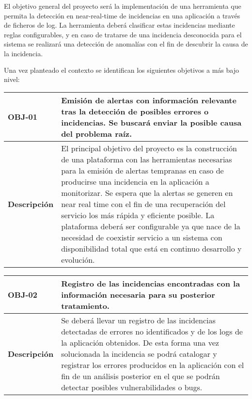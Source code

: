 El objetivo general del proyecto será la implementación de una herramienta que permita la detección en near-real-time de incidencias en una aplicación a través de ficheros de log. La herramienta deberá clasificar estas incidencias mediante reglas configurables, y en caso de tratarse de una incidencia desconocida para el sistema se realizará una detección de anomalías con el fin de descubrir la causa de la incidencia.

Una vez planteado el contexto se identifican los siguientes objetivos a más bajo nivel:


\begin{table}[H]
\centering
\renewcommand{\arraystretch}{1.5}
\begin{tabular}{| p{2.5cm} | p{10cm} |}
\hline
\bf{OBJ-01} \cellcolor{Gray} & \textbf{Emisión de alertas con información relevante tras la detección de posibles errores o
incidencias. Se buscará enviar la posible causa del problema raíz.} \\
\hline
\bf{Descripción} \cellcolor{Gray} & 
El principal objetivo del proyecto es la construcción de una plataforma con las herramientas necesarias para la emisión de alertas tempranas en caso de producirse una incidencia en la aplicación a monitorizar. Se espera que la alertas se generen en near real time con el fin de una recuperación del servicio los más rápida y eficiente posible. La plataforma deberá ser configurable ya que nace de la necesidad de coexistir servicio a un sistema con disponibilidad total que está en continuo desarrollo y evolución.
\\
\hline
\end{tabular}
\end{table}


\begin{table}[H]
\centering
\renewcommand{\arraystretch}{1.5}
\begin{tabular}{| p{2.5cm} | p{10cm} |}
\hline

\bf{OBJ-02} \cellcolor{Gray} & \textbf{Registro de las incidencias encontradas con la información necesaria para su posterior
tratamiento.} \\
\hline
\bf{Descripción} \cellcolor{Gray} & Se deberá llevar un registro de las incidencias detectadas de errores no identificados y de los logs de la aplicación obtenidos. De esta forma una vez solucionada la incidencia se podrá catalogar y registrar los errores producidos en la aplicación con el fin de un análisis posterior en el que se podrán detectar posibles vulnerabilidades o bugs.
\\
\hline
\end{tabular}
\end{table}


